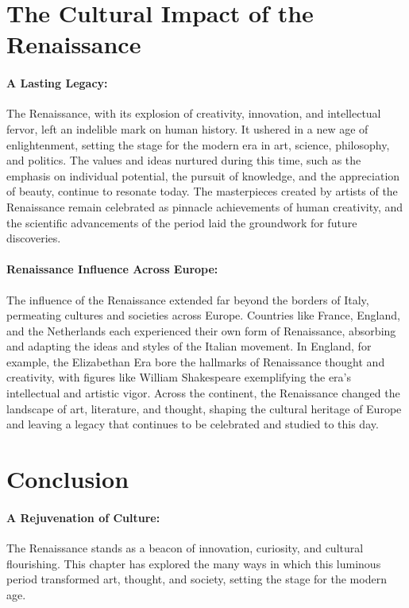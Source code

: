 \documentclass[a4paper,12pt]{book}
\begin{document}
\section*{The Cultural Impact of the Renaissance}

\paragraph{A Lasting Legacy:}
The Renaissance, with its explosion of creativity, innovation, and intellectual fervor, left an indelible mark on human history. It ushered in a new age of enlightenment, setting the stage for the modern era in art, science, philosophy, and politics. The values and ideas nurtured during this time, such as the emphasis on individual potential, the pursuit of knowledge, and the appreciation of beauty, continue to resonate today. The masterpieces created by artists of the Renaissance remain celebrated as pinnacle achievements of human creativity, and the scientific advancements of the period laid the groundwork for future discoveries.

\paragraph{Renaissance Influence Across Europe:}
The influence of the Renaissance extended far beyond the borders of Italy, permeating cultures and societies across Europe. Countries like France, England, and the Netherlands each experienced their own form of Renaissance, absorbing and adapting the ideas and styles of the Italian movement. In England, for example, the Elizabethan Era bore the hallmarks of Renaissance thought and creativity, with figures like William Shakespeare exemplifying the era’s intellectual and artistic vigor. Across the continent, the Renaissance changed the landscape of art, literature, and thought, shaping the cultural heritage of Europe and leaving a legacy that continues to be celebrated and studied to this day.

\section*{Conclusion}

\paragraph{A Rejuvenation of Culture:}
The Renaissance stands as a beacon of innovation, curiosity, and cultural flourishing. This chapter has explored the many ways in which this luminous period transformed art, thought, and society, setting the stage for the modern age.
\end{document}
